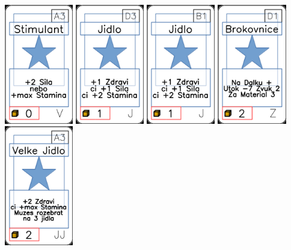 \documentclass[a4paper]{article}
\begin{document}
	\includegraphics[width=3.0cm]{img-1_62}
	\includegraphics[width=3.0cm]{img-1_17}
	\includegraphics[width=3.0cm]{img-1_5}
	\includegraphics[width=3.0cm]{img-1_105}
	\includegraphics[width=3.0cm]{img-1_32}
\end{document}

